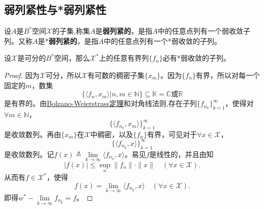 \documentclass[../../main.tex]{subfiles}%
\begin{document}
\subsection{弱列紧性与*弱列紧性}

\begin{definition}
设$A$是$B^*$空间$\mathscr{X}$的子集,称集$A$是\textbf{弱列紧的}，是指$A$中的任意点列有一个弱收敛子列。又称$A$是*\textbf{弱列紧的}，是指$A$中的任意点列有一个*弱收敛的子列。
\end{definition}

\begin{theorem}
设$\mathscr{X}$是可分的$B^*$空间，那么$\mathscr{X}^*$上的任意有界列$\{f_n\}$必有*弱收敛的子列。
\end{theorem}
\begin{proof}

因为$\mathscr{X}$可分，所以$\mathscr{X}$有可数的稠密子集$\{x_m\}$。因为$\{f_n\}$有界，所以对每一个固定的$m$，数集
$$\{\langle f_n,x_m\rangle|n,m\in\mathbb{N}\}\subseteq \mathbb{K}=\mathbb{C}\text{或}\mathbb{R}$$
是有界的。由\hyperref[Complex-Analysis-theorem:Bolzano-Weierstrass定理]{Bolzano-Weierstrass定理}和对角线法则,存在子列$\{f_{n_k}\}_{k=1}^{\infty}$，使得对$\forall m\in\mathbb{N}$，
$$\{\langle f_{n_k},x_m\rangle\}_{k=1}^{\infty}$$
是收敛数列。再由$\{x_m\}$在$\mathscr{X}$中稠密，以及$\{f_n\}$有界，可见对于$\forall x\in\mathscr{X}$，
$$\{\langle f_{n_k},x\rangle\}_{k=1}^{\infty}$$
是收敛数列。记$f(x)\triangleq\lim\limits_{k\to\infty}\langle f_{n_k},x\rangle$。易见$f$是线性的，并且由知
$$|f(x)|\leqslant\sup\limits_{n}\|f_n\|\cdot\|x\|\quad(\forall x\in\mathscr{X}).$$
从而有$f\in\mathscr{X}^*$，使得
$$f(x)=\lim\limits_{k\to\infty}\langle f_{n_k},x\rangle\quad(\forall x\in\mathscr{X}).$$
即得$w^*-\lim\limits_{k\to\infty}f_{n_k}=f$。

\end{proof}
\end{document}
